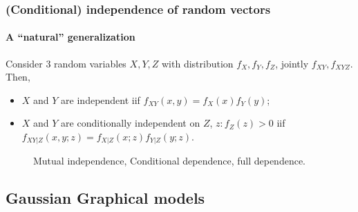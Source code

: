 \begin{frame}
  \frametitle{(Conditional) independence of random vectors}
  \framesubtitle{A ``natural'' generalization}

   \begin{definition}   Consider   3   random   variables   $X,Y,Z$   with
     distribution $f_X,f_Y,f_Z$, jointly $f_{XY}, f_{XYZ}$. Then,
     \begin{itemize}
     \item  $X$  and $Y$  are  independent  iif  $f_{XY}(x,y) =  f_{X}(x)
       f_{Y}(y)$;
     \item $X$ and $Y$ are conditionally independent on $Z$, $z:f_Z(z)>0$ iif
       $f_{XY|Z}(x,y;z) = f_{X|Z}(x;z) f_{Y|Z}(y;z)$.
     \end{itemize}
   \end{definition}


   \def\firstcircle{(0,0) circle (2.25cm)}
   \def\secondcircle{(45:3.5cm) circle (2.25cm)}
   \def\thirdcircle{(0:3.5cm) circle (2.25cm)}

   \begin{figure}[htbp!]
     \centering
     \caption{Mutual independence, Conditional dependence, full dependence.}
   \end{figure}

 \end{frame}

\subsection{Gaussian Graphical models}


